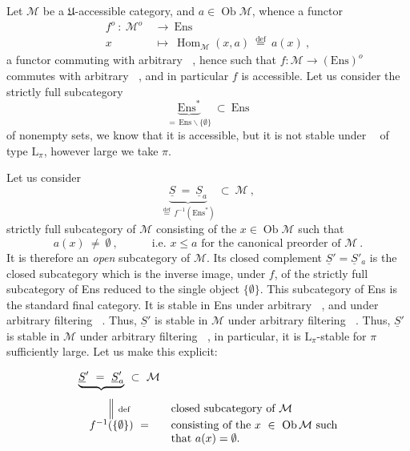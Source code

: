 \documentclass[11pt]{article}
\newcommand{\msp}[1]{\marginpar{\footnotesize [#1]}}
\newcommand{\limind}{\mathop{\underrightarrow{\mathrm{lim}}}}
\newcommand{\limproj}{\mathop{\underleftarrow{\mathrm{lim}}}}
\begin{document}
Let $\mathcal{M}$ be a $\mathfrak{U}$-accessible category, and $a\in\operatorname{Ob}\mathcal{M}$, whence a functor
\[
\begin{aligned}
f^o\ :\ \mathcal{M}^o\ &\longrightarrow\ \mathrm{Ens}\\
x\ &\longmapsto\ \operatorname{Hom}_{\mathcal{M}}(x,a)\ \overset{\text{def}}{=}\ a(x)\ ,
\end{aligned}
\]
a functor commuting with arbitrary $\limproj$, hence such that $f:\mathcal{M}\longrightarrow(\mathrm{Ens})^o$ commutes with arbitrary $\limind$, and in particular $f$ is accessible. Let us consider the strictly full subcategory
\msp{page 12}
\[
\underbrace{\mathrm{Ens}^*}_{=\,\mathrm{Ens}\backslash\{\emptyset\}}\ \subset\ \mathrm{Ens}
\]
of nonempty sets, we know that it is accessible, but it is not stable under $\limproj$ of type $\mathrm{L}_\pi$, however large we take $\pi$. %

Let us consider
\[
\underbrace{\underline{S}\ =\ \underline{S}_a}_{\overset{\text{def}}{=}\,f^{-1}(\mathrm{Ens}^*)}\ \subset\ \mathcal{M}\ ,
\]
strictly full subcategory of $\mathcal{M}$ consisting of the $x\in\operatorname{Ob}\mathcal{M}$ such that
\[
a(x)\ \neq\ \emptyset\ ,\qquad\quad \text{i.e. } x\leqslant a \text{ for the canonical preorder of } \mathcal{M}\ .
\]
It is therefore an \textit{open} subcategory of $\mathcal{M}$. Its closed complement $\underline{S}'=\underline{S}'_a$ is the closed subcategory which is the inverse image, under $f$, of the strictly full subcategory of Ens reduced to the single object $\{\emptyset\}$. This subcategory of Ens is the standard final category. It is stable in Ens under arbitrary $\limind$, and under arbitrary filtering $\limproj$. Thus, $\underline{S}'$ is stable in $\mathcal{M}$ under arbitrary filtering $\limind$. Thus, $\underline{S}'$ is stable in $\mathcal{M}$ under arbitrary filtering $\limind$, in particular, it is $\mathrm{L}_\pi$-stable for $\pi$ sufficiently large. Let us make this explicit:

\msp{page 13}
\[
\begin{array}{cl}
\underbrace{\underline{S}'\ =\ \underline{S}'_a}_{}\ \subset\ \mathcal{M} & \\
\Big\|\ \text{\scriptsize def} & \text{closed subcategory of } \mathcal{M}\\
f^{-1}(\{\emptyset\})\ = & \text{consisting of the } x\ \in\ \operatorname{Ob}\mathcal{M} \text{ such}\\
 & \text{that } a(x)=\emptyset.
\end{array}
\]
\end{document}
